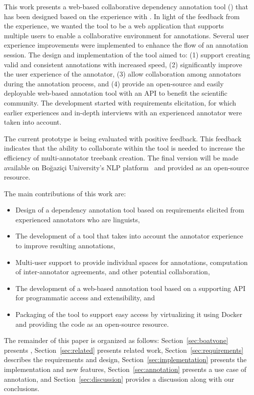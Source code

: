 This work presents a web-based collaborative dependency annotation tool (\boatvtwo) that has been designed based on the experience with \boatvone.
In light of the feedback from the experience, we wanted the tool to be a web application that supports multiple users to enable a collaborative environment for annotations.
Several user experience improvements were implemented to enhance the flow of an annotation session.
The design and implementation of the tool aimed to: (1) support creating valid and consistent annotations with increased speed, (2) significantly improve the user experience of the annotator, (3) allow collaboration among annotators during the annotation process, and (4) provide an open-source and easily deployable web-based annotation tool with an API to benefit the scientific community.
The development started with requirements elicitation, for which earlier experiences and in-depth interviews with an experienced annotator were taken into account.

The current prototype is being evaluated with positive feedback.
This feedback indicates that the ability to collaborate within the tool is needed to increase the efficiency of multi-annotator treebank creation.
The final version will be made available on Boğaziçi University's NLP platform~\cite{DIP} and provided as an open-source resource.

The main contributions of this work are:
\begin{itemize}
\setlength\itemsep{0em}
        \item Design of a dependency annotation tool based on requirements elicited from experienced annotators who are linguists,
        \item The development of a tool that takes into account the annotator experience to improve resulting annotations,
        \item Multi-user support to provide individual spaces for annotations, computation of inter-annotator agreements, and other potential collaboration,
        \item The development of a web-based annotation tool based on a supporting API for programmatic access and extensibility, and
        \item Packaging of the tool to support easy access by virtualizing it using Docker~\cite{docker} and providing the code as an open-source resource.
\end{itemize}

The remainder of this paper is organized as follows:
Section~\ref{sec:boatvone} presents \boatvone,
Section~\ref{sec:related} presents related work,
Section~\ref{sec:requirements} describes the requirements and design,
Section~\ref{sec:implementation} presents the implementation and new features,
Section~\ref{sec:annotation} presents a use case of annotation, and
Section~\ref{sec:discussion} provides a discussion along with our conclusions.
